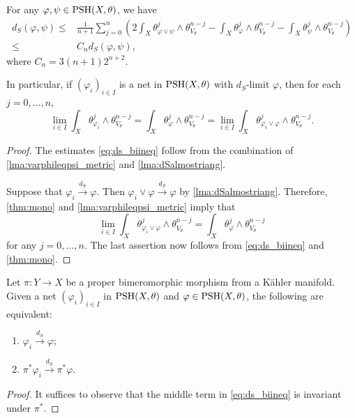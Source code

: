 \begin{corollary}\label{cor:dsmetricdoubleineq}
    For any $\varphi,\psi\in \mathrm{PSH}(X,\theta)$, we have
    \begin{equation}\label{eq:ds_biineq}
        \begin{split}
            d_S(\varphi,\psi)\leq & \frac{1}{n+1}\sum_{j=0}^n \left( 2\int_X \theta_{\varphi\lor \psi}^j\wedge \theta_{V_{\theta}}^{n-j}-\int_X \theta_{\varphi}^j\wedge \theta_{V_{\theta}}^{n-j}-\int_X \theta_{\psi}^j\wedge \theta_{V_{\theta}}^{n-j} \right) \\
            \leq & C_n d_S(\varphi,\psi),
        \end{split}
\end{equation}
where $C_n=3(n+1)2^{n+2}$.

In particular, if $(\varphi_i)_{i\in I}$ is a net in $\mathrm{PSH}(X,\theta)$ with $d_S$-limit $\varphi$, then for each $j=0,\ldots,n$,
\[
    \lim_{i\in I}\int_X \theta_{\varphi_i}^j\wedge \theta_{V_{\theta}}^{n-j}=\int_X \theta_{\varphi}^j\wedge \theta_{V_{\theta}}^{n-j}=\lim_{i\in I}\int_X \theta_{\varphi_i\lor \varphi}^j\wedge \theta_{V_{\theta}}^{n-j}.
\]
\end{corollary}
\begin{proof}
    The estimates \eqref{eq:ds_biineq} follow from the combination of \cref{lma:varphileqpsi_metric} and \cref{lma:dSalmostriang}.

    Suppose that $\varphi_i\xrightarrow{d_S}\varphi$. Then $\varphi_i\lor \varphi\xrightarrow{d_S}\varphi$ by \cref{lma:dSalmostriang}. Therefore, \cref{thm:mono} and \cref{lma:varphileqpsi_metric} imply that
    \[
    \lim_{i\in I}\int_X \theta_{\varphi_i\lor \varphi}^j\wedge \theta_{V_{\theta}}^{n-j}= \int_X \theta_{\varphi}^j\wedge \theta_{V_{\theta}}^{n-j}
    \]
    for any $j=0,\ldots,n$.
    The last assertion now follows from \eqref{eq:ds_biineq} and \cref{thm:mono}.
\end{proof}

\begin{corollary}\label{cor:dSconv_bimero}
    Let $\pi\colon Y\rightarrow X$ be a proper bimeromorphic morphism from a Kähler manifold. Given a net $(\varphi_i)_{i\in I}$ in $\mathrm{PSH}(X,\theta)$ and $\varphi\in \mathrm{PSH}(X,\theta)$, the following are equivalent:
    \begin{enumerate}
        \item $\varphi_i\xrightarrow{d_S}\varphi$;
        \item $\pi^*\varphi_i\xrightarrow{d_S}\pi^*\varphi$.
    \end{enumerate}
\end{corollary}
\begin{proof}
    It suffices to observe that the middle term in \eqref{eq:ds_biineq} is invariant under $\pi^*$.
\end{proof}

